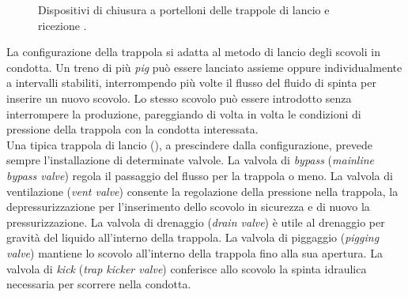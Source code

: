 \begin{figure}[htbp]
    \centering
     \qquad
\caption{Dispositivi di chiusura a portelloni delle trappole di lancio e ricezione \parencite{williamson2015guide}.}
\label{fig:chiusuratrappola}
\end{figure}

La configurazione della trappola si adatta al metodo di lancio degli scovoli in condotta. Un treno di più \textit{pig} può essere lanciato assieme oppure individualmente a intervalli stabiliti, interrompendo più volte il flusso del fluido di spinta per inserire un nuovo scovolo. Lo stesso scovolo può essere introdotto senza interrompere la produzione, pareggiando di volta in volta le condizioni di pressione della trappola con la condotta interessata.\\
Una tipica trappola di lancio (), a prescindere dalla configurazione, prevede sempre l'installazione di determinate valvole.
La valvola di \textit{bypass} (\textit{mainline bypass valve}) regola il passaggio del flusso per la trappola o meno.
La valvola di ventilazione (\textit{vent valve}) consente la regolazione della pressione nella trappola, la depressurizzazione per l'inserimento dello scovolo in sicurezza e di nuovo la pressurizzazione.
La valvola di drenaggio (\textit{drain valve}) è utile al drenaggio per gravità del liquido all'interno della trappola.
La valvola di piggaggio (\textit{pigging valve}) mantiene lo scovolo all'interno della trappola fino alla sua apertura. 
La valvola di \textit{kick} (\textit{trap kicker valve}) conferisce allo scovolo la spinta idraulica necessaria per scorrere nella condotta.

